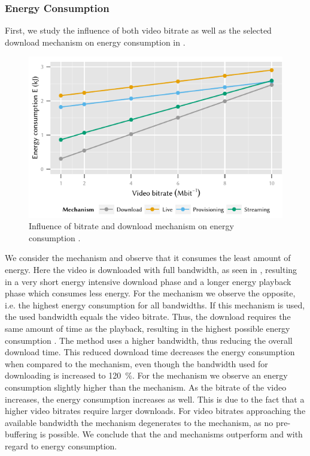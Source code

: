 \subsubsection*{Energy Consumption}\label{sec:application:lte_video:numerical_evaluation:energy_consumption}
First, we study the influence of both video bitrate as well as the selected download mechanism on energy consumption in .
\begin{figure}
  \centering
  \includegraphics{application/lte_video/numerical_evaluation/figures/bitrate2energy}
  \caption{Influence of bitrate and download mechanism on energy consumption \energyconsumption.}
  \label{fig:application:lte_video:numerical_evaluation:energy_consumption:bitrate2energy}
\end{figure}

We consider the \download mechanism and observe that it consumes the least amount of energy.
Here the video is downloaded with full bandwidth, as seen in , resulting in a very short energy intensive download phase and a longer energy playback phase which consumes less energy.
For the \live mechanism we observe the opposite, i.e. the highest energy consumption for all bandwidths.
If this mechanism is used, the used bandwidth equals the video bitrate.
Thus, the download requires the same amount of time as the playback, resulting in the highest possible energy consumption \energyconsumption.
The \serviceprovisioning method uses a higher bandwidth, thus reducing the overall download time.
This reduced download time decreases the energy consumption \energyconsumption when compared to the \live mechanism, even though the bandwidth used for downloading is increased to \SI{120}{\percent}.
For the \streaming mechanism we observe an energy consumption \energyconsumption slightly higher than the \download mechanism.
As the bitrate of the video increases, the energy consumption \energyconsumption increases as well.
This is due to the fact that a higher video bitrates require larger downloads.
For video bitrates approaching the available bandwidth the \streaming mechanism degenerates to the \live mechanism, as no pre-buffering is possible.
We conclude that the \download and \streaming mechanisms outperform \live and \serviceprovisioning with regard to energy consumption.

